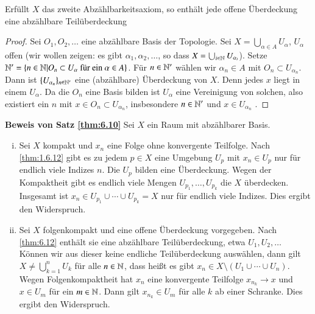 \documentclass[a4paper,10pt]{scrartcl}
\begin{document}
\begin{lem}\label{thm:6.12}
 Erfüllt $X$ das zweite Abzählbarkeitsaxiom,  so enthält jede offene Überdeckung eine abzählbare Teilüberdeckung
\end{lem}
\begin{proof}
 Sei $O_1,O_2,\dotsc$ eine abzählbare Basis der Topologie. Sei $X=\bigcup_{\alpha\in A} U_\alpha$, $U_\alpha$ 
offen (wir wollen zeigen:  es gibt $\alpha_1, \alpha_2,\dotsc$, so dass $X=\bigcup_{i \in \mathbb{N}} U_{\alpha_i}$). 
Setze $\mathbb{N}'=\{n\in \mathbb{N}|O_n \subset U_\alpha \text{ für ein } \alpha \in A\}$.
Für $n\in \mathbb{N}'$ wählen wir $\alpha_n\in A$ mit $O_n\subset U_{\alpha_n}$. Dann ist $\{U_{\alpha_n}\}_{n\in \mathbb{N}'}$ eine (abzählbare) Überdeckung von $X$. 
Denn jedes $x$ liegt in einem $U_\alpha$. Da die $O_n$ eine Basis bilden ist $U_\alpha$ eine Vereinigung von solchen, also existiert ein $n$ mit $x\in O_n\subset U_{\alpha_n}$, insbesondere $n\in \mathbb{N}'$ und $x\in U_{\alpha_n}$ .
\end{proof}
\begin{seg}{\textbf{Beweis von Satz \ref{thm:6.10}}}
 Sei $X$ ein Raum mit abzählbarer Basis.
\begin{enumerate}[(i)]
 \item Sei $X$ kompakt und $x_n$ eine Folge ohne konvergente Teilfolge. Nach \ref{thm:1.6.12} gibt es zu jedem $p\in X$ eine Umgebung $U_p$ mit $x_n\in U_p$ nur für endlich viele Indizes $n$. Die $U_p$ bilden eine Überdeckung. Wegen der Kompaktheit gibt es endlich viele Mengen $U_{p_1}, \dotsc, U_{p_k}$ die $X$ überdecken. Insgesamt ist $x_n\in U_{p_1}\cup \dotsb \cup U_{p_k}=X$ nur für endlich viele Indizes. Dies ergibt den Widerspruch.
 \item Sei $X$ folgenkompakt und eine offene Überdeckung vorgegeben. Nach \ref{thm:6.12} enthält sie eine abzählbare Teilüberdeckung, etwa $U_1, U_2, \dotsc  $ Können wir aus dieser keine endliche Teilüberdeckung auswählen, dann gilt $X\neq \bigcup_{k=1}^nU_k$ für alle $n \in \mathbb{N}$, dass heißt es gibt $x_n\in X\setminus(U_1\cup\dotsb \cup U_n)$. Wegen Folgenkompaktheit hat $x_n$ eine konvergente Teilfolge $x_{n_k} \to x$ und $x\in U_m$ für ein $m\in \mathbb{N}$. Dann gilt $x_{n_k}\in U_m$ für alle $k$ ab einer Schranke. Dies ergibt den Widerspruch.
\end{enumerate}
\end{seg}
\end{document}
